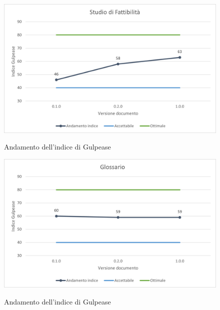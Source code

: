 \begin{figure}[H]
\centering
\includegraphics[scale=0.78]{res/ResocontoAttivitaDiVerifica/res/metriche/grafici/img/gulpeaseSDF.png}\\
\caption{Andamento dell'indice di Gulpease \SdF}
\end{figure}

\begin{figure}[H]
\centering
\includegraphics[scale=0.78]{res/ResocontoAttivitaDiVerifica/res/metriche/grafici/img/gulpeaseG.png}\\
\caption{Andamento dell'indice di Gulpease \Glossario}
\end{figure}

